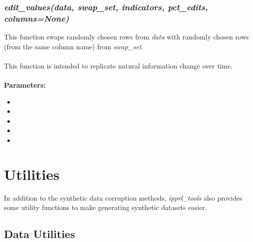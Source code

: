 \documentclass[titlepage, 11pt]{article}
\newcommand{\pkgname}{\textit{ipprl\_tools}}
\begin{document}
\subsubsection{\textit{edit\_values(data, swap\_set, indicators, pct\_edits, columns=None)}}
This function swaps randomly chosen rows from \textit{data} with randomly chosen rows (from the same column name) from \textit{swap\_set}. 
\\
\\
This function is intended to replicate natural information change over time.
\\
\\
\textbf{Parameters:}
\begin{itemize}
    \item \docdata
    \item {}
    \item \docindc
    \item {}
    \item \doccols
\end{itemize}

\section{Utilities}
In addition to the synthetic data corruption methods, \pkgname{} also provides some utility functions to make generating synthetic datasets easier.
\subsection{Data Utilities}
\end{document}
